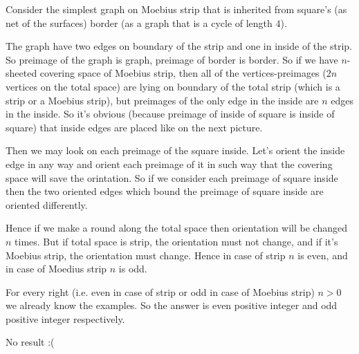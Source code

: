 \documentclass[12pt,a4paper]{article}
\begin{document}
    \begin{problem}{24}
        Consider the simplest graph on Moebius strip that is inherited from square's (as net of the surfaces) border (as a graph that is a cycle of length $4$).
        \begin{figure}[H]
            \centering
        \end{figure}
        The graph have two edges on boundary of the strip and one in inside of the strip. So preimage of the graph is graph, preimage of border is border. So if we have $n$-sheeted covering space of Moebius strip, then all of the vertices-preimages ($2n$ vertices on the total space) are lying on boundary of the total strip (which is a strip or a Moebius strip), but preimages of the only edge in the inside are $n$ edges in the inside. So it's obvious (because preimage of inside of square is inside of square) that inside edges are placed like on the next picture.
        \begin{figure}[H]
            \centering
        \end{figure}
        Then we may look on each preimage of the square inside. Let's orient the inside edge in any way and orient each preimage of it in such way that the covering space will save the orintation. So if we consider each preimage of square inside then the two oriented edges which bound the preimage of square inside are oriented differently.
        \begin{figure}[H]
            \centering
        \end{figure}
        Hence if we make a round along the total space then orientation will be changed $n$ times. But if total space is strip, the orientation must not change, and if it's Moebius strip, the orientation must change. Hence in case of strip $n$ is even, and in case of Moedius strip $n$ is odd.

        For every right (i.e. even in case of strip or odd in case of Moebius strip) $n > 0$ we already know the examples. So the answer is even positive integer and odd positive integer respectively. 
    \end{problem}

    \begin{problem}{28}
        No result :(
    \end{problem}
\end{document}
